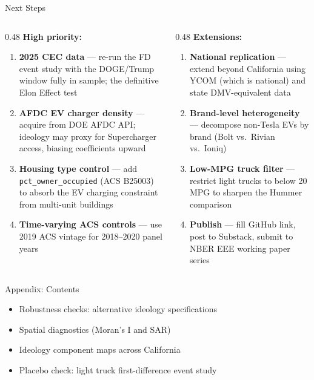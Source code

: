 \documentclass[aspectratio=169,t]{beamer}
\begin{document}
\begin{frame}{Next Steps}
  \begin{columns}[T]
    \begin{column}{0.48\textwidth}
      \textbf{High priority:}
      \begin{enumerate}\small
        \item \textbf{2025 CEC data} --- re-run the FD event study with the
        DOGE/Trump window fully in sample; the definitive Elon Effect test
        \item \textbf{AFDC EV charger density} --- acquire from DOE AFDC API;
        ideology may proxy for Supercharger access, biasing coefficients upward
        \item \textbf{Housing type control} --- add \texttt{pct\_owner\_occupied}
        (ACS B25003) to absorb the EV charging constraint from multi-unit buildings
        \item \textbf{Time-varying ACS controls} --- use 2019 ACS vintage for
        2018--2020 panel years
      \end{enumerate}
    \end{column}
    \begin{column}{0.48\textwidth}
      \textbf{Extensions:}
      \begin{enumerate}\small
        \setcounter{enumi}{4}
        \item \textbf{National replication} --- extend beyond California
        using YCOM (which is national) and state DMV-equivalent data
        \item \textbf{Brand-level heterogeneity} --- decompose non-Tesla EVs
        by brand (Bolt vs.\ Rivian vs.\ Ioniq)
        \item \textbf{Low-MPG truck filter} --- restrict light trucks to
        below 20 MPG to sharpen the Hummer comparison
        \item \textbf{Publish} --- fill GitHub link, post to Substack,
        submit to NBER EEE working paper series
      \end{enumerate}
    \end{column}
  \end{columns}
\end{frame}

\appendix

\begin{frame}{Appendix: Contents}
  \begin{itemize}
    \item[A1--A2] Robustness checks: alternative ideology specifications
    \item[A3] Spatial diagnostics (Moran's I and SAR)
    \item[A4--A11] Ideology component maps across California
    \item[A12] Placebo check: light truck first-difference event study
  \end{itemize}
\end{frame}
\end{document}

